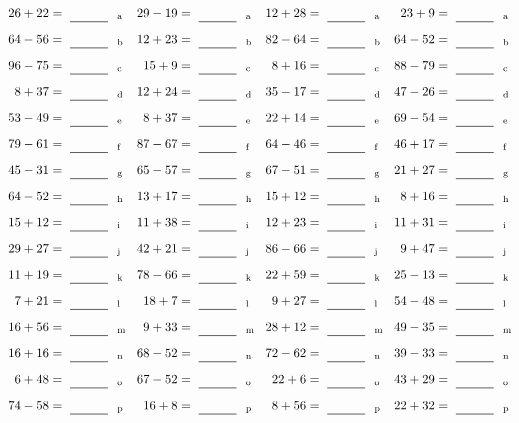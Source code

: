 \documentclass
[
  draft    = true,
  fontsize = 11pt,
  parskip  = half-
]
{scrartcl}
\begin{document}
\clearpage
\begin{align*}
    \pline{26+22}&=\rline{a}
  & \pline{29-19}&=\rline{a}
  & \pline{12+28}&=\rline{a}
  & \pline{23+9}&=\rline{a} \\[1ex]
    \pline{64-56}&=\rline{b}
  & \pline{12+23}&=\rline{b}
  & \pline{82-64}&=\rline{b}
  & \pline{64-52}&=\rline{b} \\[1ex]
    \pline{96-75}&=\rline{c}
  & \pline{15+9}&=\rline{c}
  & \pline{8+16}&=\rline{c}
  & \pline{88-79}&=\rline{c} \\[1ex]
    \pline{8+37}&=\rline{d}
  & \pline{12+24}&=\rline{d}
  & \pline{35-17}&=\rline{d}
  & \pline{47-26}&=\rline{d} \\[1ex]
    \pline{53-49}&=\rline{e}
  & \pline{8+37}&=\rline{e}
  & \pline{22+14}&=\rline{e}
  & \pline{69-54}&=\rline{e} \\[1ex]
    \pline{79-61}&=\rline{f}
  & \pline{87-67}&=\rline{f}
  & \pline{64-46}&=\rline{f}
  & \pline{46+17}&=\rline{f} \\[1ex]
    \pline{45-31}&=\rline{g}
  & \pline{65-57}&=\rline{g}
  & \pline{67-51}&=\rline{g}
  & \pline{21+27}&=\rline{g} \\[1ex]
    \pline{64-52}&=\rline{h}
  & \pline{13+17}&=\rline{h}
  & \pline{15+12}&=\rline{h}
  & \pline{8+16}&=\rline{h} \\[1ex]
    \pline{15+12}&=\rline{i}
  & \pline{11+38}&=\rline{i}
  & \pline{12+23}&=\rline{i}
  & \pline{11+31}&=\rline{i} \\[1ex]
    \pline{29+27}&=\rline{j}
  & \pline{42+21}&=\rline{j}
  & \pline{86-66}&=\rline{j}
  & \pline{9+47}&=\rline{j} \\[1ex]
    \pline{11+19}&=\rline{k}
  & \pline{78-66}&=\rline{k}
  & \pline{22+59}&=\rline{k}
  & \pline{25-13}&=\rline{k} \\[1ex]
    \pline{7+21}&=\rline{l}
  & \pline{18+7}&=\rline{l}
  & \pline{9+27}&=\rline{l}
  & \pline{54-48}&=\rline{l} \\[1ex]
    \pline{16+56}&=\rline{m}
  & \pline{9+33}&=\rline{m}
  & \pline{28+12}&=\rline{m}
  & \pline{49-35}&=\rline{m} \\[1ex]
    \pline{16+16}&=\rline{n}
  & \pline{68-52}&=\rline{n}
  & \pline{72-62}&=\rline{n}
  & \pline{39-33}&=\rline{n} \\[1ex]
    \pline{6+48}&=\rline{o}
  & \pline{67-52}&=\rline{o}
  & \pline{22+6}&=\rline{o}
  & \pline{43+29}&=\rline{o} \\[1ex]
    \pline{74-58}&=\rline{p}
  & \pline{16+8}&=\rline{p}
  & \pline{8+56}&=\rline{p}
  & \pline{22+32}&=\rline{p}
\end{align*}
\end{document}

